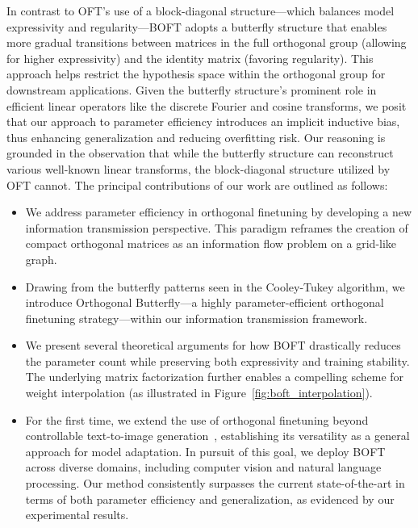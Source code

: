 In contrast to OFT's use of a block-diagonal structure—which balances model expressivity and regularity—BOFT adopts a butterfly structure that enables more gradual transitions between matrices in the full orthogonal group (allowing for higher expressivity) and the identity matrix (favoring regularity). This approach helps restrict the hypothesis space within the orthogonal group for downstream applications. Given the butterfly structure’s prominent role in efficient linear operators like the discrete Fourier and cosine transforms, we posit that our approach to parameter efficiency introduces an implicit inductive bias, thus enhancing generalization and reducing overfitting risk. Our reasoning is grounded in the observation that while the butterfly structure can reconstruct various well-known linear transforms, the block-diagonal structure utilized by OFT cannot. The principal contributions of our work are outlined as follows:

\begin{itemize}[leftmargin=*,nosep]
    \item We address parameter efficiency in orthogonal finetuning by developing a new information transmission perspective. This paradigm reframes the creation of compact orthogonal matrices as an information flow problem on a grid-like graph.
    \item Drawing from the butterfly patterns seen in the Cooley-Tukey algorithm, we introduce Orthogonal Butterfly—a highly parameter-efficient orthogonal finetuning strategy—within our information transmission framework.
    \item We present several theoretical arguments for how BOFT drastically reduces the parameter count while preserving both expressivity and training stability. The underlying matrix factorization further enables a compelling scheme for weight interpolation (as illustrated in Figure~\ref{fig:boft_interpolation}).
    \item For the first time, we extend the use of orthogonal finetuning beyond controllable text-to-image generation~\cite{qiu2023controlling}, establishing its versatility as a general approach for model adaptation. In pursuit of this goal, we deploy BOFT across diverse domains, including computer vision and natural language processing. Our method consistently surpasses the current state-of-the-art in terms of both parameter efficiency and generalization, as evidenced by our experimental results.
\end{itemize}

